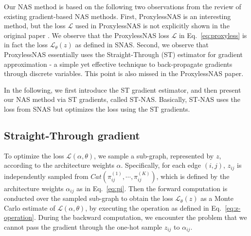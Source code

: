 \documentclass{article}
\newcommand{\neqref}{Eq.~\eqref}
\begin{document}
Our NAS method is based on the following two observations from the review of existing gradient-based NAS methods.
First, ProxylessNAS is an interesting method, but the loss $\mathcal{L}$ used in ProxylessNAS is not explicitly shown in the original paper \cite{cai2018proxelessnas}. We observe that the ProxylessNAS loss $\mathcal{L}$ in \neqref{eq:proxyless} is in fact the loss $\mathcal{L}_\theta(z)$ as defined in SNAS.
Second, we observe that ProxylessNAS essentially uses the Straight-Through (ST) estimator \cite{bengio2013estimating} for gradient approximation - a simple yet effective technique to back-propagate gradients through discrete variables. This point is also missed in the ProxylessNAS paper.

In the following, we first introduce the ST gradient estimator, and then present our NAS method via ST gradients, called ST-NAS. Basically, ST-NAS uses the loss from SNAS but optimizes the loss using the ST gradients.

\subsection{Straight-Through gradient}
To optimize the loss $\mathcal{L}(\alpha,\theta)$, we sample a sub-graph, represented by $z$, according to the architecture weights $\alpha$.
Specifically, for each edge $(i,j)$, $z_{ij}$ is independently sampled from $Cat(\pi_{ij}^{(1)}, \cdots, \pi_{ij}^{(K)})$, which is defined by the architecture weights $\alpha_{ij}$ as in \neqref{eq:pi}.
Then the forward computation is conducted over the sampled sub-graph to obtain the loss $\mathcal{L}_\theta(z)$ as a Monte Carlo estimate of $\mathcal{L}(\alpha,\theta)$, by executing the operation as defined in \neqref{eq:z-operation}.
During the backward computation, we encounter the problem that we cannot pass the gradient through the one-hot sample $z_{ij}$ to $\alpha_{ij}$.
\end{document}
